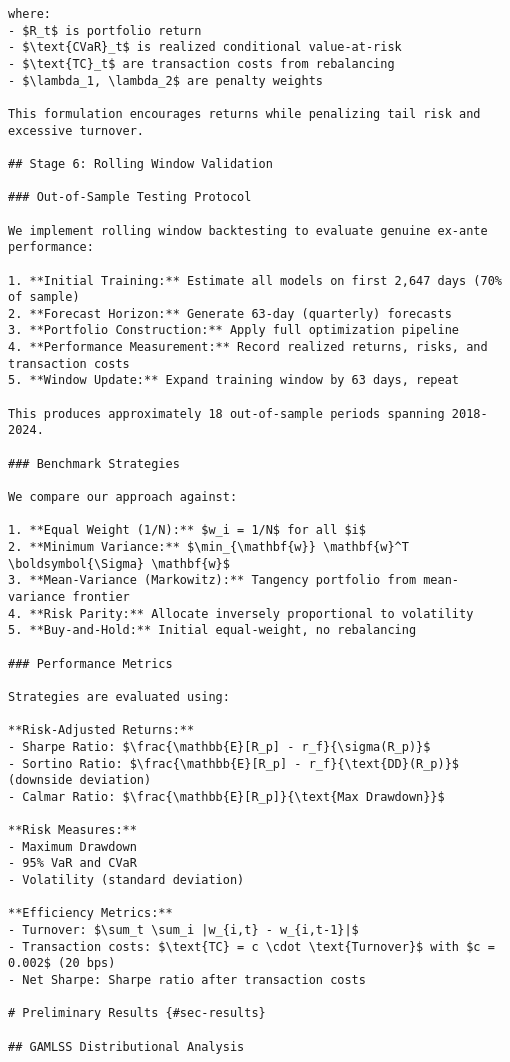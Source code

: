 \documentclass[
  10pt,
  a4paper,
]{article}
\begin{document}
\begin{tcolorbox}
\begin{verbatim}
where:
- $R_t$ is portfolio return
- $\text{CVaR}_t$ is realized conditional value-at-risk
- $\text{TC}_t$ are transaction costs from rebalancing
- $\lambda_1, \lambda_2$ are penalty weights

This formulation encourages returns while penalizing tail risk and excessive turnover.

## Stage 6: Rolling Window Validation

### Out-of-Sample Testing Protocol

We implement rolling window backtesting to evaluate genuine ex-ante performance:

1. **Initial Training:** Estimate all models on first 2,647 days (70% of sample)
2. **Forecast Horizon:** Generate 63-day (quarterly) forecasts
3. **Portfolio Construction:** Apply full optimization pipeline
4. **Performance Measurement:** Record realized returns, risks, and transaction costs
5. **Window Update:** Expand training window by 63 days, repeat

This produces approximately 18 out-of-sample periods spanning 2018-2024.

### Benchmark Strategies

We compare our approach against:

1. **Equal Weight (1/N):** $w_i = 1/N$ for all $i$
2. **Minimum Variance:** $\min_{\mathbf{w}} \mathbf{w}^T \boldsymbol{\Sigma} \mathbf{w}$
3. **Mean-Variance (Markowitz):** Tangency portfolio from mean-variance frontier
4. **Risk Parity:** Allocate inversely proportional to volatility
5. **Buy-and-Hold:** Initial equal-weight, no rebalancing

### Performance Metrics

Strategies are evaluated using:

**Risk-Adjusted Returns:**
- Sharpe Ratio: $\frac{\mathbb{E}[R_p] - r_f}{\sigma(R_p)}$
- Sortino Ratio: $\frac{\mathbb{E}[R_p] - r_f}{\text{DD}(R_p)}$ (downside deviation)
- Calmar Ratio: $\frac{\mathbb{E}[R_p]}{\text{Max Drawdown}}$

**Risk Measures:**
- Maximum Drawdown
- 95% VaR and CVaR
- Volatility (standard deviation)

**Efficiency Metrics:**
- Turnover: $\sum_t \sum_i |w_{i,t} - w_{i,t-1}|$
- Transaction costs: $\text{TC} = c \cdot \text{Turnover}$ with $c = 0.002$ (20 bps)
- Net Sharpe: Sharpe ratio after transaction costs

# Preliminary Results {#sec-results}

## GAMLSS Distributional Analysis


\end{verbatim}
\end{tcolorbox}
\end{document}
